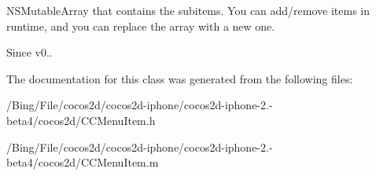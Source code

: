 N\-S\-Mutable\-Array that contains the subitems. You can add/remove items in runtime, and you can replace the array with a new one. \begin{DoxySince}{Since}
v0.. 
\end{DoxySince}


The documentation for this class was generated from the following files\-:\begin{DoxyCompactItemize}
\item 
/\-Bing/\-File/cocos2d/cocos2d-\/iphone/cocos2d-\/iphone-\/2.-\/beta4/cocos2d/C\-C\-Menu\-Item.\-h\item 
/\-Bing/\-File/cocos2d/cocos2d-\/iphone/cocos2d-\/iphone-\/2.-\/beta4/cocos2d/C\-C\-Menu\-Item.\-m\end{DoxyCompactItemize}

